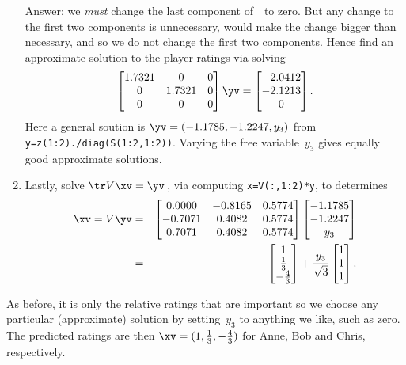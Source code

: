 \begin{example}
\begin{enumerate}
Answer: we \emph{must} change the last component of~\zv\ to zero. 
But any change to the first two components is unnecessary, would make the change bigger than necessary, and so we do not change the first two components.
Hence find an approximate solution to the player ratings via solving
\begin{equation*}
\begin{bmatrix} 1.7321&0&0
\\0&1.7321&0
\\0&0&0 \end{bmatrix}\yv=\begin{bmatrix} 
   -2.0412\\-2.1213\\0
\end{bmatrix}.
\end{equation*}
Here a general soution is \(\yv=(-1.1785,-1.2247,y_3)\) from \verb|y=z(1:2)./diag(S(1:2,1:2))|.
Varying the free variable~\(y_3\) gives equally good approximate solutions.

\item Lastly, solve \(\tr V\xv=\yv\)\,, via computing \verb|x=V(:,1:2)*y|, to determines
\begin{eqnarray*}
\xv=V\yv&=&
\begin{bmatrix} 0.0000 & -0.8165 & 0.5774
\\ -0.7071 & 0.4082 & 0.5774
\\  0.7071 & 0.4082 & 0.5774
 \end{bmatrix}\begin{bmatrix} -1.1785\\-1.2247\\y_3 \end{bmatrix}
\\&=&\begin{bmatrix} 1\\\frac13\\-\frac43 \end{bmatrix}
+\frac{y_3}{\sqrt3}\begin{bmatrix} 1\\1\\1 \end{bmatrix}.
\end{eqnarray*}
\end{enumerate}
As before, it is only the relative ratings that are important so we  choose any particular (approximate) solution by setting~\(y_3\) to anything we like, such as zero.
The predicted ratings are then \(\xv=(1,\frac13,-\frac43)\) for Anne, Bob and Chris, respectively.
\end{example}

